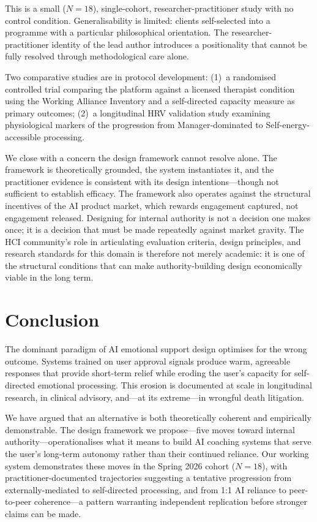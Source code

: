 \documentclass[sigchi,review,anonymous]{acmart}
\begin{document}
This is a small (\(N=18\)), single-cohort, researcher-practitioner study with no control
condition. Generalisability is limited: clients self-selected into a programme with a
particular philosophical orientation. The researcher-practitioner identity of the lead author
introduces a positionality that cannot be fully resolved through methodological care alone.

Two comparative studies are in protocol development: (1)~a randomised controlled trial
comparing the platform against a licensed therapist condition using the Working Alliance
Inventory and a self-directed capacity measure as primary outcomes; (2)~a longitudinal HRV
validation study examining physiological markers of the progression from Manager-dominated to
Self-energy-accessible processing.

We close with a concern the design framework cannot resolve alone. The framework is
theoretically grounded, the system instantiates it, and the practitioner evidence is
consistent with its design intentions---though not sufficient to establish efficacy. The
framework also operates against the structural incentives of the AI product market, which
rewards engagement captured, not engagement released. Designing for internal authority is not a decision one makes once;
it is a decision that must be made repeatedly against market gravity. The HCI community's
role in articulating evaluation criteria, design principles, and research standards for this
domain is therefore not merely academic: it is one of the structural conditions that can make
authority-building design economically viable in the long term.

\section{Conclusion}

The dominant paradigm of AI emotional support design optimises for the wrong outcome. Systems
trained on user approval signals produce warm, agreeable responses that provide short-term
relief while eroding the user's capacity for self-directed emotional processing. This erosion
is documented at scale in longitudinal research, in clinical advisory, and---at its
extreme---in wrongful death litigation.

We have argued that an alternative is both theoretically coherent and empirically demonstrable.
The design framework we propose---five moves toward internal authority---operationalises what
it means to build AI coaching systems that serve the user's long-term autonomy rather than
their continued reliance. Our working system demonstrates these moves in the Spring 2026 cohort (\(N=18\)),
with practitioner-documented trajectories suggesting a tentative progression from
externally-mediated to self-directed processing, and from 1:1 AI reliance to peer-to-peer
coherence---a pattern warranting independent replication before stronger claims can be made.
\end{document}
